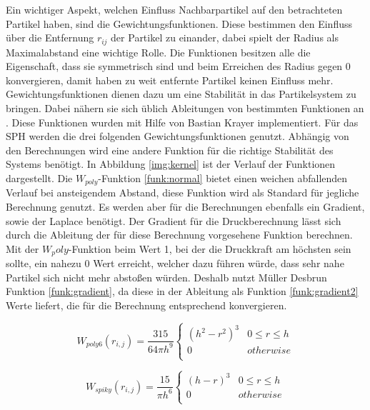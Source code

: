 \documentclass[intern,palatino]{cgBA}
\begin{document}
Ein wichtiger Aspekt, welchen Einfluss Nachbarpartikel auf den betrachteten Partikel haben, sind die Gewichtungsfunktionen. Diese bestimmen den Einfluss über die Entfernung $r_{ij}$ der Partikel zu einander, dabei spielt der Radius als Maximalabstand eine wichtige Rolle. Die Funktionen besitzen alle die Eigenschaft, dass sie symmetrisch sind und beim Erreichen des Radius gegen 0 konvergieren, damit haben zu weit entfernte Partikel keinen Einfluss mehr. Gewichtungsfunktionen dienen dazu um eine Stabilität in das Partikelsystem zu bringen. Dabei nähern sie sich üblich Ableitungen von bestimmten Funktionen an \cite{muller2003particle}. Diese Funktionen wurden mit Hilfe von Bastian Krayer implementiert.
\newline
Für das SPH werden die drei folgenden Gewichtungsfunktionen genutzt. Abhängig von den Berechnungen wird eine andere Funktion für die richtige Stabilität des Systems benötigt. In Abbildung \ref{img:kernel} ist der Verlauf der Funktionen dargestellt.
\newline
Die $W_{poly}$-Funktion \ref{funk:normal} bietet einen weichen abfallenden Verlauf bei ansteigendem Abstand, diese Funktion wird als Standard für jegliche Berechnung genutzt.
\newline
Es werden aber für die Berechnungen ebenfalls ein Gradient, sowie der Laplace benötigt. Der Gradient für die Druckberechnung lässt sich durch die Ableitung der für diese Berechnung vorgesehene Funktion berechnen. Mit der $W_poly$-Funktion beim Wert 1, bei der die Druckkraft am höchsten sein sollte, ein nahezu 0 Wert erreicht, welcher dazu führen würde, dass sehr nahe Partikel sich nicht mehr abstoßen würden. Deshalb nutzt Müller Desbrun \cite{desbrun1996smoothed} Funktion \ref{funk:gradient}, da diese in der Ableitung als Funktion  \ref{funk:gradient2} Werte liefert, die für die Berechnung entsprechend konvergieren.
\newline\newline

\begin{equation}\label{funk:normal}
	W_{poly6}(r_{i,j}) = \frac{315}{64 \pi h^9}   
	\begin{cases}
	(h^2 - r^2)^3 		& 0	\leq r \leq h	\\
	0					& otherwise			\\
	\end{cases}
\end{equation}

\begin{equation}\label{funk:gradient}
W_{spiky}(r_{i,j}) = \frac{15}{\pi h^6}   
\begin{cases}
(h - r)^3 		& 0	\leq r \leq h	\\
0					& otherwise			\\
\end{cases}
\end{equation}
\end{document}
